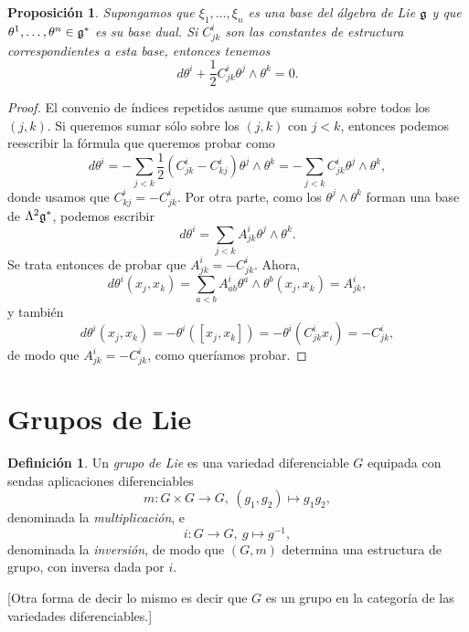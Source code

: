 \documentclass[11pt,a4paper]{amsbook}
\newtheorem{prop}[subsection]{Proposición}
\theoremstyle{remark} \newtheorem{rmk}[subsection]{Observación}
\theoremstyle{definition} \newtheorem{defn}[subsection]{Definición}
\theoremstyle{definition} \newtheorem{ex}[subsection]{Ejemplo}
\theoremstyle{definition} \newtheorem{ej}[subsection]{Ejercicio}
\begin{document}
\begin{prop}
 Supongamos que $\xi_1,\dots,\xi_n$ es una base del álgebra de Lie $\mathfrak{g}$ y que $\theta^1,\dots,\theta^n \in \mathfrak{g}^*$ es su base dual. Si $C^i_{jk}$ son las constantes de estructura correspondientes a esta base, entonces tenemos
\begin{equation*}
d \theta^i + \frac{1}{2} C^i_{jk} \theta^j\wedge \theta^k = 0.
\end{equation*}
\end{prop}

\begin{proof}
El convenio de índices repetidos asume que sumamos sobre todos los $(j,k)$. Si queremos sumar sólo sobre los $(j,k)$ con $j< k$, entonces podemos reescribir la fórmula que queremos probar como
\begin{equation*}
d\theta^i = - \sum_{j < k} \frac{1}{2} (C^i_{jk}-C^i_{kj}) \theta^j\wedge \theta^k = - \sum_{j<k} C^i_{jk} \theta^j\wedge \theta^k,
\end{equation*}
donde usamos que $C^i_{kj} = -C^i_{jk}$.
Por otra parte, como los $\theta^j\wedge \theta^k$ forman una base de $\Lambda^2 \mathfrak{g}^*$, podemos escribir
\begin{equation*}
d\theta^i = \sum_{j< k} A^i_{jk} \theta^j \wedge \theta^k.
\end{equation*}
Se trata entonces de probar que $A^i_{jk}=-C^i_{jk}$.
Ahora,
\begin{equation*}
d\theta^i (x_j,x_k) = \sum_{a< b} A^i_{ab} \theta^a\wedge \theta^b(x_j,x_k) = A^{i}_{jk},
\end{equation*}
y también
\begin{equation*}
d\theta^i(x_j,x_k) = -\theta^i([x_j,x_k]) = -\theta^i(C_{jk}^i x_i) = -C_{jk}^i,
\end{equation*}
de modo que $A^i_{jk}=-C^i_{jk}$, como queríamos probar.
\end{proof}

\section{Grupos de Lie}
\begin{defn}
Un \emph{grupo de Lie} es una variedad diferenciable $G$ equipada con sendas aplicaciones diferenciables
\begin{equation*}
m: G\times G \rightarrow G,\ (g_1,g_2) \mapsto g_1g_2,
\end{equation*}
denominada la \emph{multiplicación}, e
\begin{equation*}
i: G \rightarrow G,\ g\mapsto g^{-1},
\end{equation*}
denominada la \emph{inversión}, de modo que $(G,m)$ determina una estructura de grupo, con inversa dada por $i$.

[Otra forma de decir lo mismo es decir que $G$ es un grupo en la categoría de las variedades diferenciables.]
\end{defn}
\end{document}
